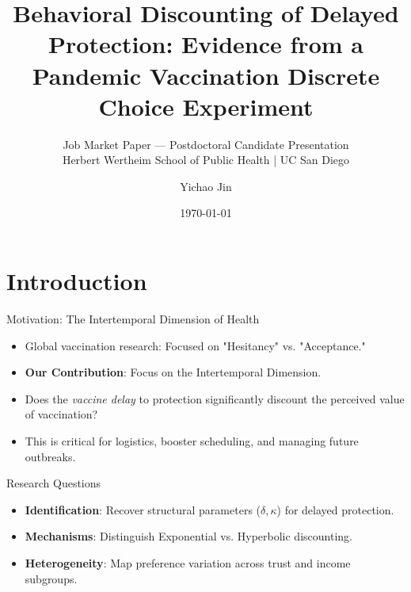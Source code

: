 \documentclass[10pt]{beamer}
\title{Behavioral Discounting of Delayed Protection: Evidence from a
Pandemic Vaccination Discrete Choice Experiment}
\subtitle{Job Market Paper --- Postdoctoral Candidate Presentation \\
\vspace{0.2em}
\small Herbert Wertheim School of Public Health | UC San Diego}
\author{Yichao Jin}
\institute{The University of Texas at Dallas}
\date{\today}
\begin{document}
\maketitle

\section{Introduction}

\begin{frame}{Motivation: The Intertemporal Dimension of Health}
    \begin{itemize}
        \item Global vaccination research: Focused on "Hesitancy" vs. "Acceptance."
        \item \textbf{Our Contribution}: Focus on the \alert{Intertemporal Dimension}.
        \item Does the \textit{vaccine delay} to protection significantly discount the perceived value of vaccination?
        \item This is critical for logistics, booster scheduling, and managing future outbreaks.
    \end{itemize}
\end{frame}

\begin{frame}{Research Questions}
  \begin{itemize}
    \item \textbf{Identification}: Recover structural parameters ($\delta, \kappa$) for delayed protection.
    \item \textbf{Mechanisms}: Distinguish Exponential vs. \alert{Hyperbolic} discounting.
    \item \textbf{Heterogeneity}: Map preference variation across trust and income subgroups.
  \end{itemize}
\end{frame}
\end{document}
